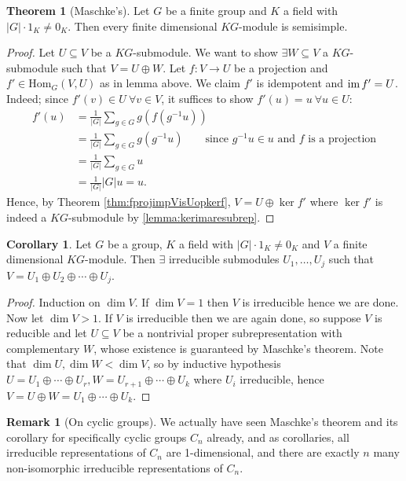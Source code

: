 \documentclass{article}
\newcommand{\Hom}{\text{Hom}}
\newcommand{\im}{\text{im\,}}
\theoremstyle{definition}
\newtheorem{thm}[defn]{Theorem}
\newtheorem{coro}[defn]{Corollary}
\newtheorem*{remark}{Remark}
\begin{document}
\begin{thm}[Maschke's]
\label{thm:Maschkes}
Let $G$ be a finite group and $K$ a field with $|G|\cdot 1_K\neq 0_K$. Then every finite dimensional $KG$-module is semisimple.
\end{thm}
\begin{proof}
Let $U\subseteq V$ be a $KG$-submodule. We want to show $\exists W\subseteq V$ a $KG$-submodule such that $V=U\oplus W$. Let $f:V\rightarrow U$ be a projection and $f'\in\Hom_G(V,U)$ as in lemma above. We claim $f'$ is idempotent and $\im f'=U$. Indeed; since $f'(v)\in U \ \forall v\in V$, it suffices to show $f'(u)=u \ \forall u\in U$:
\[
\begin{aligned}
f'(u)&=\frac{1}{|G|}\sum_{g\in G}g\left(f\left(g^{-1}u\right)\right) \\
&=\frac{1}{|G|}\sum_{g\in G}g\left(g^{-1}u\right) \qquad \text{since }g^{-1}u\in u\text{ and }f\text{ is a projection}\\
&=\frac{1}{|G|}\sum_{g\in G}u\\
&=\frac{1}{|G|}|G|u=u.
\end{aligned}
\]
Hence, by Theorem \ref{thm:fprojimpVisUopkerf}, $V=U\oplus\ker f'$ where $\ker f'$ is indeed a $KG$-submodule by \ref{lemma:kerimaresubrep}.
\end{proof}

\begin{coro}
Let $G$ be a group, $K$ a field with $|G|\cdot 1_K\neq 0_K$ and $V$ a finite dimensional $KG$-module. Then $\exists$ irreducible submodules $U_1,\ldots,U_j$ such that $V=U_1\oplus U_2\oplus\cdots\oplus U_j$.
\end{coro}
\begin{proof}
Induction on $\dim V$. If $\dim V=1$ then $V$ is irreducible hence we are done. Now let $\dim V>1$. If $V$ is irreducible then we are again done, so suppose $V$ is reducible and let $U\subseteq V$ be a nontrivial proper subrepresentation with complementary $W$, whose existence is guaranteed by Maschke's theorem. Note that $\dim U,\dim W<\dim V$, so by inductive hypothesis $U=U_1\oplus\cdots\oplus U_r,W=U_{r+1}\oplus\cdots\oplus U_k$ where $U_i$ irreducible, hence $V=U\oplus W=U_1\oplus\cdots\oplus U_k$.
\end{proof}

\begin{remark}[On cyclic groups]
We actually have seen Maschke's theorem and its corollary for specifically cyclic groups $C_n$ already, and as corollaries, all irreducible representations of $C_n$ are 1-dimensional, and there are exactly $n$ many non-isomorphic irreducible representations of $C_n$.
\end{remark}
\end{document}
